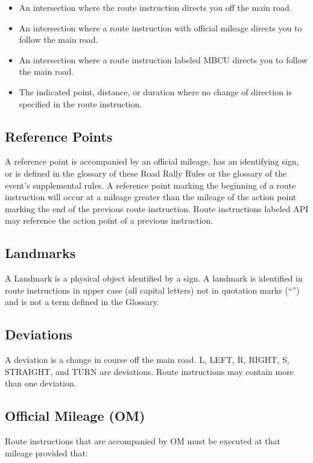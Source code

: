 \begin{itemize}

\item An intersection where the route instruction directs you off the main road.

\item An intersection where a route instruction with official mileage directs you to follow the main road.

\item An intersection where a route instruction labeled MBCU directs you to follow the main road.

\item The indicated point, distance, or duration where no change of direction is specified in the route instruction.

\end{itemize}

\subsection{Reference Points}
A reference point is accompanied by an official mileage, has an identifying sign, or is defined in the glossary of these Road Rally Rules or the glossary of the event's supplemental rules.  A reference point marking the beginning of a route instruction will occur at a mileage greater than the mileage of the action point marking the end of the previous route instruction.  Route instructions labeled API may reference the action point of a previous instruction.

\subsection{Landmarks}
A Landmark is a physical object identified by a sign.  A landmark is identified in route instructions in upper case (all capital letters) not in quotation marks (``'') and is not a term defined in the Glossary.

\subsection{Deviations}
A deviation is a change in course off the main road. L, LEFT, R, RIGHT, S, STRAIGHT, and TURN are deviations.  Route instructions may contain more than one deviation.

\subsection{Official Mileage (OM)}
Route instructions that are accompanied by OM must be executed at that mileage provided that:

